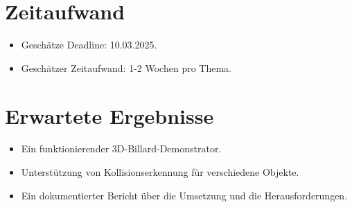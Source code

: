 \documentclass[11pt,a4paper]{article}
\begin{document}
	\section*{Zeitaufwand}
\begin{itemize}
	\item Geschätze Deadline: 10.03.2025.
	\item Geschätzer Zeitaufwand: 1-2 Wochen pro Thema.
\end{itemize}

\section*{Erwartete Ergebnisse}
\begin{itemize}
	\item Ein funktionierender 3D-Billard-Demonstrator.
	\item Unterstützung von Kollisionserkennung für verschiedene Objekte.
	\item Ein dokumentierter Bericht über die Umsetzung und die Herausforderungen.
\end{itemize}
	
\end{document}

